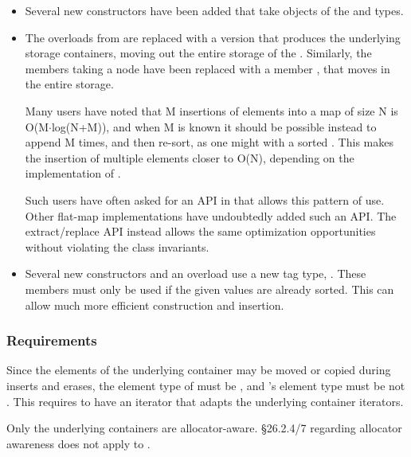 \begin{itemize}
  \item Several new constructors have been added that take objects of the
     and  types.

  \item The  overloads from  are replaced with a
    version that produces the underlying storage containers, moving out the
    entire storage of the .  Similarly, the 
    members taking a node have been replaced with a member , that moves in the entire
    storage.

    Many users have noted that M insertions of elements into a map of size N
    is O(M$\cdot$log(N+M)), and when M is known it should be possible instead
    to append M times, and then re-sort, as one might with a sorted
    .  This makes the insertion of multiple elements closer to
    O(N), depending on the implementation of .

    Such users have often asked for an API in
     that allows this pattern of use.  Other
    flat-map implementations have undoubtedly added such an API.  The
    extract/replace API instead allows the same optimization opportunities
    without violating the class invariants.

  \item Several new constructors and an  overload use a new tag
    type, .  These members must only be used if the
    given values are already sorted.  This can allow much more efficient
    construction and insertion.
\end{itemize}

\subsubsection{ Requirements}

Since the elements of the underlying container may be moved or copied during
inserts and erases, the element type of  must be
, and 's element type must be not .
This requires  to have an iterator that adapts the underlying
container iterators.

Only the underlying containers are allocator-aware.  \S26.2.4/7 regarding
allocator awareness does not apply to .

